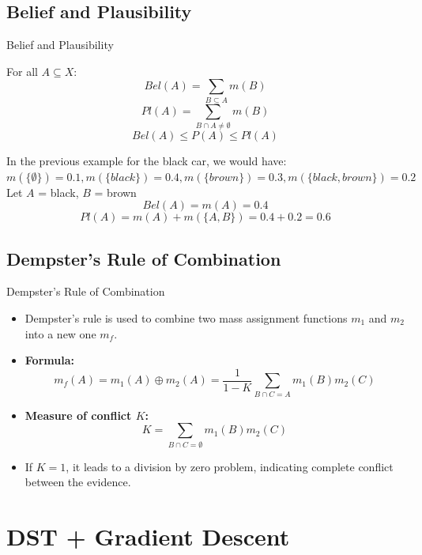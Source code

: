 \documentclass[aspectratio=169]{beamer}
\begin{document}
\subsection{Belief and Plausibility}
\begin{frame}{Belief and Plausibility}
    \begin{block}{}
         For all \( A \subseteq X \):
          \[
          Bel(A) = \sum_{B \subseteq A} m(B)
          \]
        \[
          Pl(A) = \sum_{B \cap A \neq \emptyset} m(B)
          \]
            \[
            Bel(A) \le P(A) \le Pl(A)
            \]

    In the previous example for the black car, we would have:
    $m(\{\emptyset\}) = 0.1, m(\{ black\}) = 0.4, m(\{ brown\}) = 0.3, m(\{ black, brown\}) = 0.2$ \\
    Let $A$ = black, $B$ = brown
          \[
        Bel(A) = m(A) = 0.4 \]
        \[
        Pl(A) = m(A) + m(\{A, B\}) = 0.4 + 0.2 = 0.6
          \]
    \end{block}
\end{frame}

\subsection{Dempster's Rule of Combination}
\begin{frame}{Dempster's Rule of Combination}
\begin{itemize}
  \item Dempster's rule is used to combine two mass assignment functions \(m_1\) and \(m_2\) into a new one \(m_f\).
  \item \textbf{Formula:}
    \begin{equation*}
      m_f(A) = m_1(A) \oplus m_2(A) = \frac{1}{1 - K} \sum_{B \cap C = A} m_1(B) m_2(C)
    \end{equation*}
    \pause
  \item \textbf{Measure of conflict \(K\):}
    \begin{equation*}
      K = \sum_{B \cap C = \emptyset} m_1(B) m_2(C)
    \end{equation*}
    \pause
  \item If $K=1$, it leads to a division by zero problem, indicating complete conflict between the evidence.
  \end{itemize}
\end{frame}

\section{DST + Gradient Descent}
\end{document}
